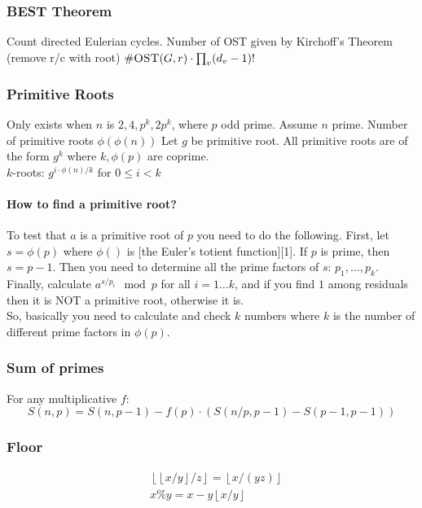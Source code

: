 \documentclass[12pt,a4paper,landscape]{amsart}
\begin{document}
\begin{multicols*}{3}
\subsubsection{BEST Theorem}
Count directed Eulerian cycles. Number of OST given by
Kirchoff's Theorem (remove r/c with root) $\#\textsc{OST}(G,r)
\cdot \prod_{v}(d_v-1)!$

\subsubsection{Primitive Roots}
Only exists when $n$ is $2, 4, p^k, 2p^k$, where $p$ odd prime. Assume
$n$ prime. Number of primitive roots $\phi(\phi(n))$
Let $g$ be primitive root. All primitive roots are of the form $g^k$
where $k,\phi(p)$ are coprime.\\ $k$-roots:
$g^{i \cdot \phi(n) / k}$ for $0 \leq i < k$
\paragraph{How to find a primitive root?}
To test that $a$ is a primitive root of $p$ you need to do the following. First, let $s=\phi(p)$ where $\phi()$ is [the Euler's totient function][1]. If $p$ is prime, then $s=p-1$. Then you need to determine all the prime factors of $s$: $p_1,\ldots,p_k$. Finally, calculate $a^{s/p_i}\mod p$ for all $i=1\ldots k$, and if you find $1$ among residuals then it is NOT a primitive root, otherwise it is.\\
So, basically you need to calculate and check $k$ numbers where $k$ is the number of different prime factors in $\phi(p)$.
\subsubsection{Sum of primes} For any multiplicative $f$:
\[
S(n,p) = S(n, p-1) - f(p) \cdot (S(n/p,p-1) - S(p-1,p-1))
\]

\subsubsection{Floor}
\begin{align*}
&\left\lfloor \left\lfloor x/y \right\rfloor / z \right\rfloor = \left\lfloor x / (yz) \right\rfloor \\
&x \% y = x - y \left\lfloor x / y \right\rfloor
\end{align*}

\clearpage
\end{multicols*}
\end{document}
